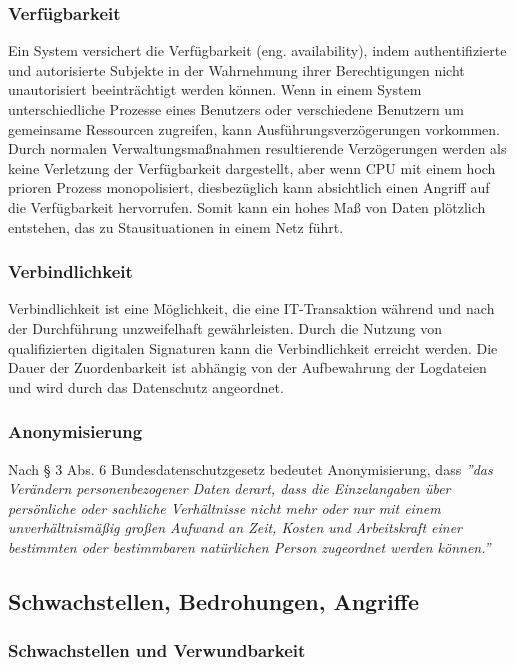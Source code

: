 \subsubsection{Verfügbarkeit}

Ein System versichert die Verfügbarkeit (eng. availability), indem authentifizierte und autorisierte Subjekte in der Wahrnehmung ihrer Berechtigungen nicht unautorisiert beeinträchtigt werden können. Wenn in einem System unterschiedliche Prozesse eines Benutzers oder verschiedene Benutzern um gemeinsame Ressourcen zugreifen, kann Ausführungsverzögerungen vorkommen. Durch normalen Verwaltungsmaßnahmen resultierende Verzögerungen werden als keine Verletzung der Verfügbarkeit dargestellt, aber wenn CPU mit einem hoch prioren Prozess monopolisiert, diesbezüglich kann absichtlich einen Angriff auf die Verfügbarkeit hervorrufen. Somit kann ein hohes Maß von Daten plötzlich entstehen, das zu Stausituationen in einem Netz führt\cite[33]{eckert2013sicherheit}.

\subsubsection{Verbindlichkeit}

Verbindlichkeit ist eine Möglichkeit, die eine IT-Transaktion während und nach der Durchführung unzweifelhaft gewährleisten. Durch die Nutzung von qualifizierten digitalen Signaturen kann die Verbindlichkeit erreicht werden. Die Dauer der Zuordenbarkeit ist abhängig von der Aufbewahrung der Logdateien und wird durch das Datenschutz angeordnet\cite{secupedia11}.

\subsubsection{Anonymisierung}

Nach § 3 Abs. 6 Bundesdatenschutzgesetz bedeutet Anonymisierung, dass \emph{''das Verändern personenbezogener Daten derart, dass die Einzelangaben über persönliche oder sachliche Verhältnisse nicht mehr oder nur mit einem unverhältnismäßig großen Aufwand an Zeit, Kosten und Arbeitskraft einer bestimmten oder bestimmbaren natürlichen Person zugeordnet werden können.''}\cite{dsba2018} 

\subsection{Schwachstellen, Bedrohungen, Angriffe}

\subsubsection{Schwachstellen und Verwundbarkeit}

